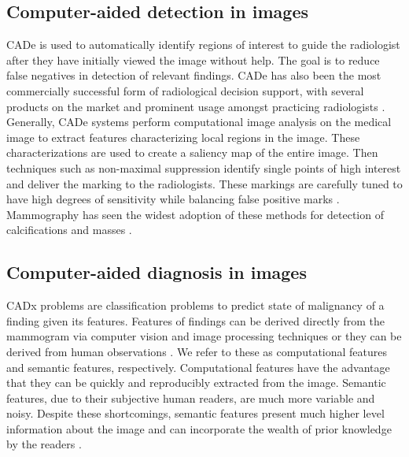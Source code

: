 \subsection{Computer-aided detection in images}
CADe is used to automatically identify regions of interest to guide the radiologist after they have initially viewed the image without help. The goal is to reduce false negatives in detection of relevant findings. CADe has also been the most commercially successful form of radiological decision support, with several products on the market and prominent usage amongst practicing radiologists \cite{Castellino:2005ke}. Generally, CADe systems perform computational image analysis on the medical image to extract features characterizing local regions in the image. These characterizations are used to create a saliency map of the entire image. Then techniques such as non-maximal suppression identify single points of high interest and deliver the marking to the radiologists. These markings are carefully tuned to have high degrees of sensitivity while balancing false positive marks \cite{Oliver:2010fm}. Mammography has seen the widest adoption of these methods for detection of calcifications and masses \cite{Cheng:2003ig,Castellino:2005ke,Meeuwis:2010bv,Oliver:2010fm,Fenton:2011fw,Fenton:2012kz,Jamieson:2012hz,Gallas:2012eg,Giger:2013jb}.


\subsection{Computer-aided diagnosis in images}

\cite{Jiang:1999fj,ElizabethS:2005gc,Gallas:2012eg,Bright:2012ga,Giger:2013jb,Depeursinge:2010jl,Fujita:2008it,Eadie:2011cv,Rubin:2005jg,Garg:2005cb,Elter:2009fv,Jamieson:2010vl,Jamieson:2010tt,Cheng:2003ig,Jiang:2001fy}
CADx problems are classification problems to predict state of malignancy of a finding given its features. Features of findings can be derived directly from the mammogram via computer vision and image processing techniques \cite{Jiang:1999fj,Jiang:2001fy, Giger:2013jb, Eadie:2011cv} or they can be derived from human observations \cite{ElizabethS:2005gc, Burnside:2000wl, Rubin:2005jg}. We refer to these as computational features and semantic features, respectively. Computational features have the advantage that they can be quickly and reproducibly extracted from the image. Semantic features, due to their subjective human readers, are much more variable and noisy. Despite these shortcomings, semantic features present much higher level information about the image and can incorporate the wealth of prior knowledge by the readers \cite{Liberman:ws,Elter:2009fv}.


